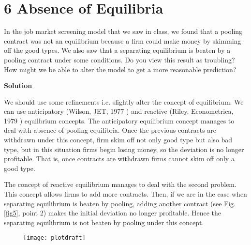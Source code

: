 \documentclass[a4paper]{article}
\begin{document}
		
		\section*{6 Absence of Equilibria}
			In the job market screening model that we saw in class, we found that a pooling contract
			was not an equilibrium because a firm could make money by skimming off the good types.
			We also saw that a separating equilibrium is beaten by a pooling contract under some
			conditions. Do you view this result as troubling? How might we be able to alter the
			model to get a more reasonable prediction?

			
			
			\textbf{Solution}
			
			We should use some refinements i.e. slightly alter the concept of equilibrium. We can use anticipatory (Wilson, JET, 1977 ) and reactive (Riley, Econometrica, 1979 ) equilbrium concepts. The anticipatory equilibrium concept manages to deal with absence of pooling equilibria. Once the previous contracts are withdrawn under this concept, firm skim off not only good type but also bad type, but in this situation firms begin losing money, so the deviation is no longer profitable. That is, once contracts are withdrawn firms cannot skim off only a good type.
			
			The concept of reactive equilibrium manages to deal with the second problem. This concept allows firms to add more contracts. Then, if we are in the case when separating equilibrium is beaten by pooling, adding another contract (see Fig. \eqref{fig5}, point 2) makes the initial deviation no longer profitable. Hence the separating equilibrium is not beaten by pooling under this concept.
				\begin{figure}[H]
				\centering
				\texttt{[image: plotdraft]}
				\caption{}\label{fig5}
			\end{figure}
\end{document}
